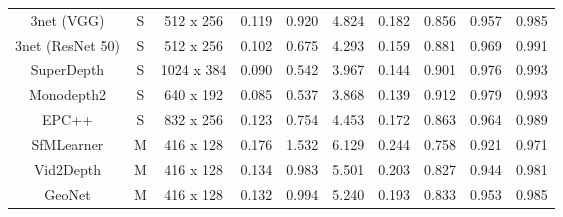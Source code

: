 \documentclass[journal]{IEEEtran}
\begin{document}
\begin{table*}
\begin{tabular}{cccccccccc}
3net \cite{poggi2018learning} (VGG)        & S                         & 512 x 256            & \multicolumn{1}{c}{0.119}   & \multicolumn{1}{c}{0.920}  & \multicolumn{1}{c}{4.824} & 0.182    & \multicolumn{1}{c}{0.856}           & \multicolumn{1}{c}{0.957}             & 0.985             \\
3net \cite{poggi2018learning} (ResNet 50)  & S                         & 512 x 256            & \multicolumn{1}{c}{0.102}   & \multicolumn{1}{c}{0.675}  & \multicolumn{1}{c}{4.293} & 0.159    & \multicolumn{1}{c}{0.881}           & \multicolumn{1}{c}{0.969}             & 0.991             \\
SuperDepth \cite{pillai2019superdepth}        & S                         & 1024 x 384           & \multicolumn{1}{c}{0.090}   & \multicolumn{1}{c}{0.542}  & \multicolumn{1}{c}{3.967} & 0.144    & \multicolumn{1}{c}{0.901}           & \multicolumn{1}{c}{0.976}             & 0.993             \\
Monodepth2 \cite{monodepth2}        & S                         & 640 x 192            & \multicolumn{1}{c}{0.085}   & \multicolumn{1}{c}{0.537}  & \multicolumn{1}{c}{3.868} & 0.139    & \multicolumn{1}{c}{0.912}           & \multicolumn{1}{c}{0.979}             & 0.993             \\
EPC++ \cite{luo2019every}             & S                         & 832 x 256            & \multicolumn{1}{c}{0.123}   & \multicolumn{1}{c}{0.754}  & \multicolumn{1}{c}{4.453} & 0.172    & \multicolumn{1}{c}{0.863}           & \multicolumn{1}{c}{0.964}             & 0.989             \\ \hline
SfMLearner \cite{zhou2017unsupervised}        & M                         & 416 x 128            & \multicolumn{1}{c}{0.176}   & \multicolumn{1}{c}{1.532}  & \multicolumn{1}{c}{6.129} & 0.244    & \multicolumn{1}{c}{0.758}           & \multicolumn{1}{c}{0.921}             & 0.971             \\
Vid2Depth \cite{mahjourian2018unsupervised}         & M                         & 416 x 128            & \multicolumn{1}{c}{0.134}   & \multicolumn{1}{c}{0.983}  & \multicolumn{1}{c}{5.501} & 0.203    & \multicolumn{1}{c}{0.827}           & \multicolumn{1}{c}{0.944}             & 0.981             \\
GeoNet \cite{yin2018geonet}            & M                         & 416 x 128            & \multicolumn{1}{c}{0.132}   & \multicolumn{1}{c}{0.994}  & \multicolumn{1}{c}{5.240} & 0.193    & \multicolumn{1}{c}{0.833}           & \multicolumn{1}{c}{0.953}             & 0.985             \\

\end{tabular}
\end{table*}
\end{document}
